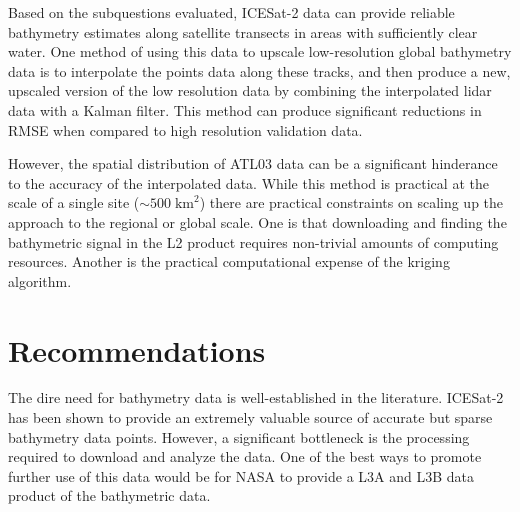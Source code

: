Based on the subquestions evaluated, ICESat-2 data can provide reliable bathymetry estimates along satellite transects in areas with sufficiently clear water. One method of using this data to upscale low-resolution global bathymetry data is to interpolate the points data along these tracks, and then produce a new, upscaled version of the low resolution data by combining the interpolated lidar data with a Kalman filter. This method can produce significant reductions in RMSE when compared to high resolution validation data. 

However, the spatial distribution of ATL03 data can be a significant hinderance to the accuracy of the interpolated data. While this method is practical at the scale of a single site ($\sim 500\;\text{km}^2$) there are practical constraints on scaling up the approach to the regional or global scale. One is that downloading and finding the bathymetric signal in the L2 product requires non-trivial amounts of computing resources. Another is the practical computational expense of the kriging algorithm.




\section{Recommendations}

The dire need for bathymetry data is well-established in the literature. ICESat-2 has been shown to provide an extremely valuable source of accurate but sparse bathymetry data points. However, a significant bottleneck is the processing required to download and analyze the data. One of the best ways to promote further use of this data would be for NASA to provide a L3A and L3B data product of the bathymetric data. 

